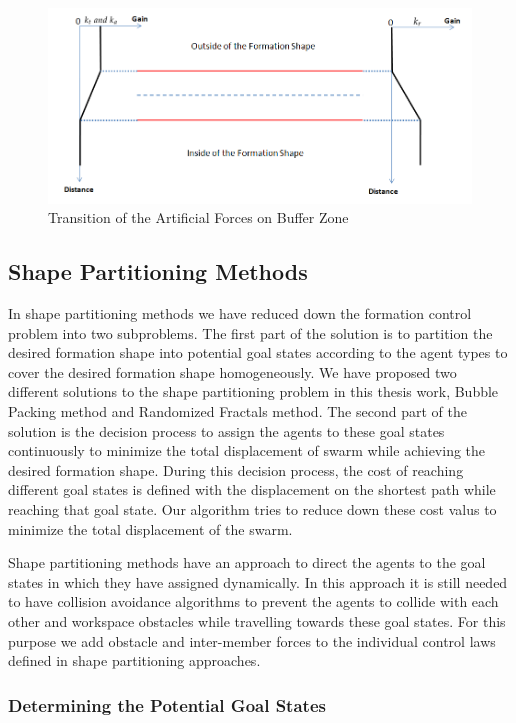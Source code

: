 \begin{figure}[H]
\caption{Transition of the Artificial Forces on Buffer Zone}
\centering
\includegraphics[scale = 0.50]{buffer_zone}
\end{figure}
					
\subsection{Shape Partitioning Methods} \label{shapepartition_ref}
In shape partitioning methods we have reduced down the formation control problem into two subproblems. The first part of the solution is to partition the desired formation shape into potential goal states according to the agent types to cover the desired formation shape homogeneously. We have proposed two different solutions to the shape partitioning problem in this thesis work, Bubble Packing method and Randomized Fractals method. The second part of the solution is the decision process to assign the agents to these goal states continuously to minimize the total displacement of swarm while achieving the desired formation shape. During this decision process, the cost of reaching different goal states is defined with the displacement on the shortest path while reaching that goal state. Our algorithm tries to reduce down these cost valus to minimize the total displacement of the swarm.

Shape partitioning methods have an approach to direct the agents to the goal states in which they have assigned dynamically. In this approach it is still needed to have collision avoidance algorithms to prevent the agents to collide with each other and workspace obstacles while travelling towards these goal states. For this purpose we add obstacle and inter-member forces to the individual control laws defined in shape partitioning approaches.
			
\subsubsection{Determining the Potential Goal States} \label{Partitioning_ref}
